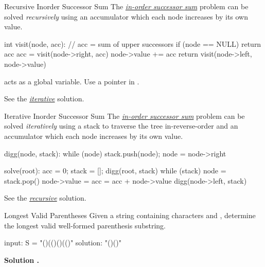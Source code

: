 \documentclass{cognito}
\begin{document}
\begin{note}{Recursive Inorder Successor Sum}
	The \hyperref[note:Inorder Successors Sum]{\it in-order successor sum} problem can be solved \emph{recursively}
	using an accumulator which each node increases by its own value.
	\begin{largecode}
 int visit(node, acc):  // acc = sum of upper successors
 	if (node == NULL) return acc
	acc = visit(node->right, acc)
	node->value += acc
	return visit(node->left, node->value)
	\end{largecode}
	\begin{remark}  acts as a global variable. Use a pointer in .\end{remark}
	\begin{remark} See the \hyperref[note:Iterative Inorder Successor Sum]{\it iterative} solution.\end{remark}\vspace{-5pt}
\end{note}

\begin{note}{Iterative Inorder Successor Sum}
	The \hyperref[note:Inorder Successors Sum]{\it in-order successor sum} problem can be solved \emph{iteratively}
	using a stack to traverse the tree in-reverse-order and an accumulator which each node increases by its own value.
	\begin{largecode}
 digg(node, stack):
 	while (node) {stack.push(node); node = node->right}

 solve(root):
 	acc = 0; stack = []; digg(root, stack)
	while (stack)
		node = stack.pop()
		node->value = acc = acc + node->value
		digg(node->left, stack)
	\end{largecode}
	\begin{remark} See the \hyperref[note:Recursive Inorder Successor Sum]{\it recursive} solution.\end{remark}\vspace{-5pt}
\end{note}

\begin{note}{Longest Valid Parentheses}
	Given a string  containing characters \incode{(} and \incode{)}, determine the longest
	valid well-formed parenthesis substring.
	
	\begin{largecode}
 input: S = "()(()()(()"
 solution:     "()()"
	\end{largecode}
	\bf Solution \hyperref[note:Longest Valid Parentheses Solution]{\solutionref}.
\end{note}
\end{document}
